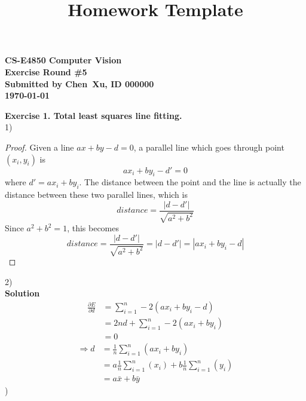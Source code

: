 \documentclass[letterpaper, 11pt]{article}
\begin{document}
\title{Homework Template}

\begin{center}
    {
        \large
        \bf
        CS-E4850 Computer Vision\\
        Exercise Round \#5\\
        Submitted by Chen\ Xu, ID 000000\\
        \today
    }
\end{center}

\bigskip

\textbf{Exercise 1. Total least squares line fitting.}\\
1)
\begin{proof}
    Given a line $ax+by-d=0$, a parallel line which goes through point $(x_i, y_i)$ is
    $$ax_i+by_i-d'=0$$
    where $d'=ax_i+by_i$. The distance between the point and the line is actually the distance between these two parallel lines, which is
    $$distance = \frac{|d-d'|}{\sqrt{a^2+b^2}}$$
    Since $a^2+b^2=1$, this becomes
    $$distance = \frac{|d-d'|}{\sqrt{a^2+b^2}}=|d-d'|=|ax_i+by_i-d|$$
\end{proof}
2)\\
\textbf{Solution}\\
\begin{align*}
    \frac{\partial E}{\partial d} & = \sum_{i=1}^{n} -2(ax_i+by_i-d)     \\
                                  & = 2nd + \sum_{i=1}^{n} -2(ax_i+by_i) \\
                                  & =0
\end{align*}
\begin{align*}
    \Rightarrow d & =\frac{1}{n}\sum_{i=1}^{n} (ax_i+by_i)                             \\
                  & =a\frac{1}{n}\sum_{i=1}^{n} (x_i)+b\frac{1}{n}\sum_{i=1}^{n} (y_i) \\
                  & =a\bar{x}+b\bar{y}
\end{align*}
)\\
\end{document}
